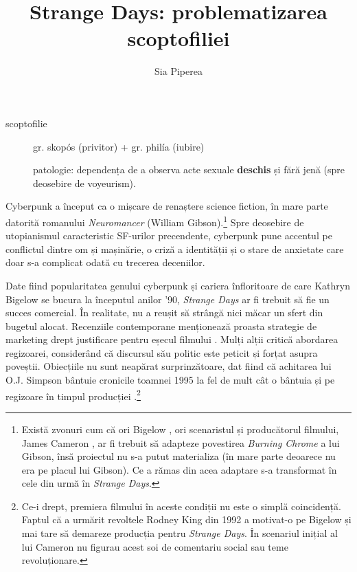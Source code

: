 \documentclass[12pt]{article}
\title{\textbf{Strange Days: problematizarea scoptofiliei}}
\author{Sia Piperea}
\date{} %
\begin{document}
	 	
\maketitle

\begin{description}
	\item[scoptofilie]\par
	gr. \dedouble skopós\sqtworight\: (privitor) + gr. \dedouble philía\sqtworight\: (iubire) \par
	patologie: dependența de a observa acte sexuale  \textbf{deschis} și fără jenă (spre deosebire de voyeurism). \par
\end{description}
		 	
Cyberpunk a început ca o mișcare de renaștere science fiction, în mare parte datorită romanului \textit{Neuromancer} (William Gibson).\footnote{Există zvonuri cum că ori Bigelow \cite{Salza1994a}, ori scenaristul și producătorul filmului, James Cameron \cite{Henry2023a}, ar fi trebuit să adapteze povestirea \textit{Burning Chrome} a lui Gibson, însă proiectul nu s-a putut materializa (în mare parte deoarece nu era pe placul lui Gibson). Ce a rămas din acea adaptare s-a transformat în cele din urmă în \textit{Strange Days}.} Spre deosebire de utopianismul caracteristic SF-urilor precendente, cyberpunk pune accentul pe conflictul dintre om și mașinărie, o criză a identității și o stare de anxietate care doar s-a complicat odată cu trecerea deceniilor.\par

Date fiind popularitatea genului cyberpunk și cariera înfloritoare de care Kathryn Bigelow se bucura la începutul anilor '90, \textit{Strange Days} ar fi trebuit să fie un succes comercial. În realitate, nu a reușit să strângă nici măcar un sfert din bugetul alocat. Recenziile contemporane menționează proasta strategie de marketing drept justificare pentru eșecul filmului \cite{McCarthy1995a}. Mulți alții critică abordarea regizoarei, considerând că discursul său politic este peticit și forțat asupra poveștii. Obiecțiile nu sunt neapărat surprinzătoare, dat fiind că achitarea lui O.J. Simpson bântuie cronicile toamnei 1995 la fel de mult cât o bântuia și pe regizoare în timpul producției \cite{Willistein1995a}.\footnote{Ce-i drept, premiera filmului în aceste condiții nu este o simplă coincidență. Faptul că a urmărit revoltele Rodney King din 1992 a motivat-o pe Bigelow și mai tare să demareze producția pentru \textit{Strange Days}. În scenariul inițial al lui Cameron nu figurau acest soi de comentariu social sau teme revoluționare.}\par
\end{document}
